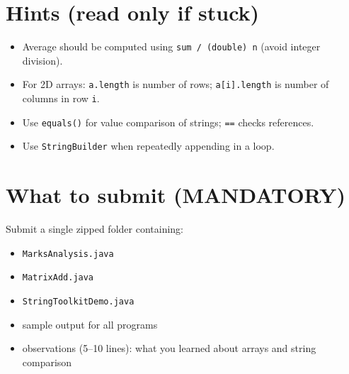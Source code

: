 \documentclass[11pt]{article}
\begin{document}
\section{Hints (read only if stuck)}
\begin{itemize}[leftmargin=*]
  \item Average should be computed using \texttt{sum / (double) n} (avoid integer division).
  \item For 2D arrays: \texttt{a.length} is number of rows; \texttt{a[i].length} is number of columns in row \texttt{i}.
  \item Use \texttt{equals()} for value comparison of strings; \texttt{==} checks references.
  \item Use \texttt{StringBuilder} when repeatedly appending in a loop.
\end{itemize}

\section{What to submit (MANDATORY)}
Submit a single zipped folder containing:
\begin{itemize}[leftmargin=*]
  \item \texttt{MarksAnalysis.java}
  \item \texttt{MatrixAdd.java}
  \item \texttt{StringToolkitDemo.java}
  \item sample output for all programs
  \item observations (5--10 lines): what you learned about arrays and string comparison
\end{itemize}

\notesources{\OOPSUnitISources}
\end{document}
